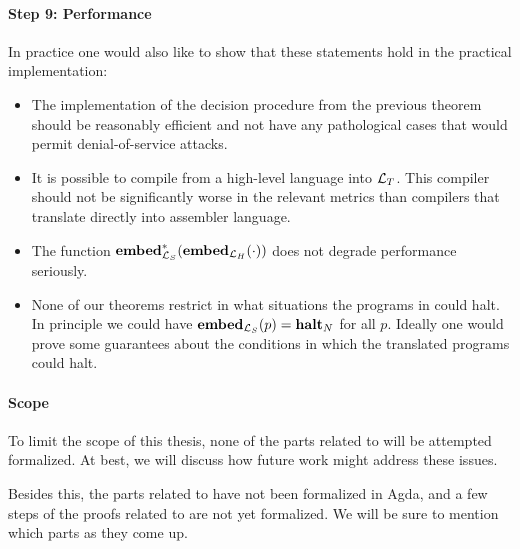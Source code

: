 \paragraph{Step 9: Performance} In practice one would also like to show that
these statements hold in the practical implementation:

\begin{itemize}
\item The implementation of the decision procedure from the previous theorem
  should be reasonably efficient and not have any pathological cases that would
  permit denial-of-service attacks.
\item It is possible to compile from a high-level language into
  $\mathcal{L}_T$. This compiler should not be significantly worse in the relevant
  metrics than compilers that translate directly into assembler language.
\item The function $\mathbf{embed}^\ast_{\mathcal{L}_S}({\mathbf{embed}}_{\mathcal{L}_H}(\cdot))$ does not degrade
  performance seriously.
\item None of our theorems restrict in what situations the programs in
  \nativelang could halt. In principle we could have
  ${\mathbf{embed}}_{\mathcal{L}_S}(p) = {\mathbf{halt}_N}$ for all $p$. Ideally one would prove some
  guarantees about the conditions in which the translated programs could halt.
\end{itemize}

\paragraph{Scope} To limit the scope of this thesis, none of the
parts related to \nativelang will be attempted formalized. At best, we will
discuss how future work might address these issues.

Besides this, the parts related to \simplelang have not been formalized in Agda,
and a few steps of the proofs related to \highlang are not yet formalized. We
will be sure to mention which parts as they come up.
